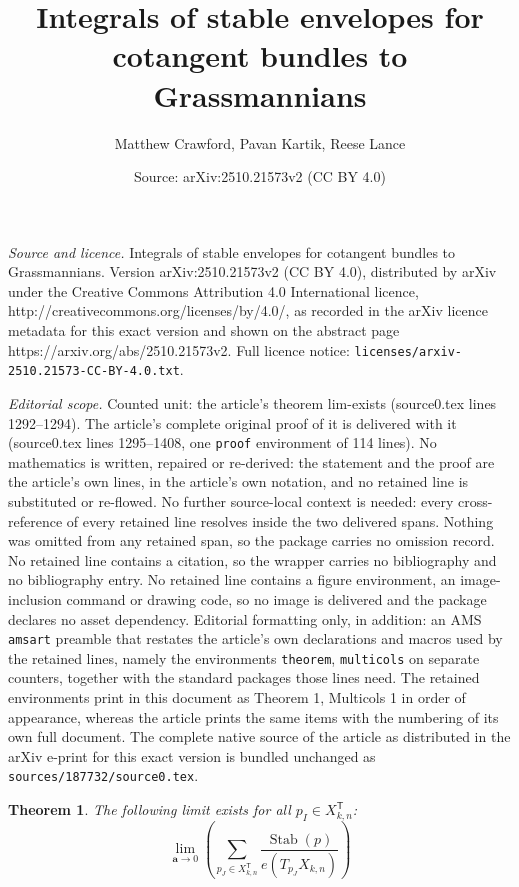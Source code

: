 \documentclass[10pt,a4paper]{amsart}
\title{Integrals of stable envelopes for cotangent bundles to Grassmannians}
\author{Matthew Crawford, Pavan Kartik, Reese Lance}
\date{Source: arXiv:2510.21573v2 (CC BY 4.0)}
\newtheorem{theorem}{Theorem}
\DeclareMathOperator{\Stab}{Stab}
\newcommand{\bT}{\mathsf{T}}
\begin{document}
\maketitle

\noindent\emph{Source and licence.} Integrals of stable envelopes for cotangent bundles to Grassmannians. Version arXiv:2510.21573v2 (CC BY 4.0), distributed by arXiv under the Creative Commons Attribution 4.0 International licence, http://creativecommons.org/licenses/by/4.0/, as recorded in the arXiv licence metadata for this exact version and shown on the abstract page https://arxiv.org/abs/2510.21573v2. Full licence notice: \texttt{licenses/arxiv-2510.21573-CC-BY-4.0.txt}.\par\smallskip

\noindent\textit{Editorial scope.} Counted unit: the article's theorem lim-exists (source0.tex lines 1292--1294). The article's complete original proof of it is delivered with it (source0.tex lines 1295--1408, one \texttt{proof} environment of 114 lines). No mathematics is written, repaired or re-derived: the statement and the proof are the article's own lines, in the article's own notation, and no retained line is substituted or re-flowed.  No further source-local context is needed: every cross-reference of every retained line resolves inside the two delivered spans.  Nothing was omitted from any retained span, so the package carries no omission record.  No retained line contains a citation, so the wrapper carries no bibliography and no bibliography entry.  No retained line contains a figure environment, an image-inclusion command or drawing code, so no image is delivered and the package declares no asset dependency.  Editorial formatting only, in addition: an AMS \texttt{amsart} preamble that restates the article's own declarations and macros used by the retained lines, namely the environments \texttt{theorem}, \texttt{multicols} on separate counters, together with the standard packages those lines need.  The retained environments print in this document as Theorem 1, Multicols 1 in order of appearance, whereas the article prints the same items with the numbering of its own full document.  The complete native source of the article as distributed in the arXiv e-print for this exact version is bundled unchanged as \texttt{sources/187732/source0.tex}.
\begin{theorem}\label{lim-exists} The following limit exists for all $p_I\in X_{k,n}^\bT$:
\[\lim_{\mathbf{a}\to 0} \left( \sum_{p_J\in X_{k,n}^\bT}\frac{\Stab(p)}{e(T_{p_J}X_{k,n})}\right) \]
\end{theorem}
\end{document}
